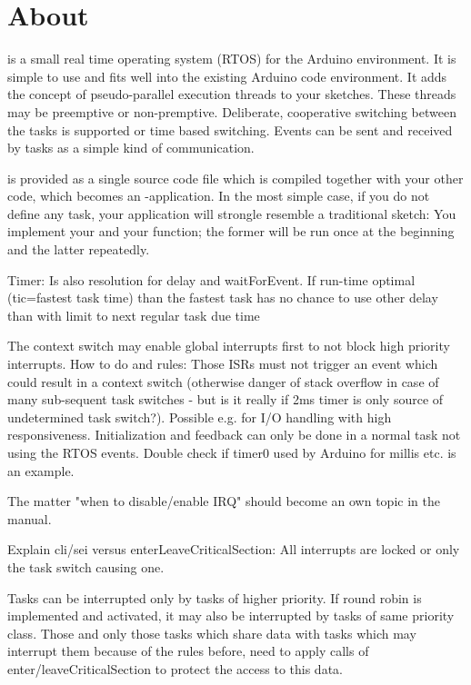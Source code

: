 \chapter{About \rtos}
\label{secAbout}

\rtos is a small real time operating system (RTOS) for the Arduino
environment. It is simple to use and fits well into the existing Arduino
code environment. It adds the concept of pseudo-parallel execution threads
to your sketches. These threads may be preemptive or non-premptive.
Deliberate, cooperative switching between the tasks is supported or time
based switching. Events can be sent and received by tasks as a simple kind
of communication.

\rtos is provided as a single source code file which is compiled together
with your other code, which becomes an \rtos-application. In the most
simple case, if you do not define any task, your application will strongle
resemble a traditional sketch: You implement your  and your
 function; the former will be run once at the beginning and
the latter repeatedly.

Timer: Is also resolution for delay and waitForEvent. If run-time optimal
(tic=fastest task time) than the fastest task has no chance to use other
delay than with limit to next regular task due time

The context switch may enable global interrupts first to not block high
priority interrupts. How to do and rules: Those ISRs must not trigger an
event which could result in a context switch (otherwise danger of stack
overflow in case of many sub-sequent task switches - but is it really if
2ms timer is only source of undetermined task switch?). Possible e.g. for
I/O handling with high responsiveness. Initialization and feedback can
only be done in a normal task not using the RTOS events.
  Double check if timer0 used by Arduino for millis etc. is an example.

The matter "when to disable/enable IRQ" should become an own topic in the
manual.

Explain cli/sei versus enterLeaveCriticalSection: All interrupts are
locked or only the task switch causing one.

Tasks can be interrupted only by tasks of higher priority. If round robin
is implemented and activated, it may also be interrupted by tasks of same
priority class. Those and only those tasks which share data with tasks
which may interrupt them because of the rules before, need to apply calls
of enter/leaveCriticalSection to protect the access to this data.

